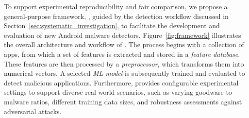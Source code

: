 
To support experimental reproducibility and fair comparison, we propose a general-purpose framework, \codename, guided by the detection workflow discussed in Section~\ref{sec:systematic_investigation}, to facilitate the development and evaluation of new Android malware detectors.
Figure~\ref{fig:framework} illustrates the overall architecture and workflow of \codename.
The process begins with a collection of apps, from which a set of features is extracted and stored in a {\em feature database}.
These features are then processed by a {\em preprocessor}, which transforms them into numerical vectors.
A selected {\em ML model} is subsequently trained and evaluated to detect malicious applications.
Furthermore, \codename provides configurable experimental settings to support diverse real-world scenarios, such as varying goodware-to-malware ratios, different training data sizes, and robustness assessments against adversarial attacks.
%

